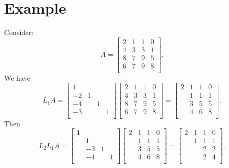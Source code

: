 \section{Example}
Consider: 
\[
    A = \begin{bmatrix}
        2 & 1 & 1 &  0 \\
        4 & 3 & 3 &  1 \\
        8 & 7 & 9 &  5 \\
        6 & 7 & 9 &  8 \\
    \end{bmatrix}.  
\]
We have 
\[
    L_1 A = \begin{bmatrix}
        1 &  &  &   \\
        -2 & 1 &  &   \\
        -4 &  & 1 &   \\
        -3 &  &  &  1 \\
    \end{bmatrix} 
    \begin{bmatrix}
        2 & 1 & 1 &  0 \\
        4 & 3 & 3 &  1 \\
        8 & 7 & 9 &  5 \\
        6 & 7 & 9 &  8 \\
    \end{bmatrix}
     = \begin{bmatrix}
        2 & 1 & 1 &  0 \\
         & 1 & 1 &  1 \\
         & 3 & 5 &  5 \\
         & 4 & 6 &  8 \\
     \end{bmatrix} . 
\]
Then 
\[
    L_2 L_1 A = \begin{bmatrix}
        1 &  &  &   \\
         & 1 &  &   \\
         & -3 & 1 &   \\
         & -4 &  &  1 \\
    \end{bmatrix}  
    \begin{bmatrix}
        2 & 1 & 1 &  0 \\
         & 1 & 1 &  1 \\
         & 3 & 5 &  5 \\
         & 4 & 6 &  8 \\
     \end{bmatrix} = \begin{bmatrix}
        2 & 1 & 1 &  0 \\
         & 1 & 1 &  1 \\
         &  & 2 &  2 \\
         &  & 2 &4   \\
     \end{bmatrix}.  
\]
